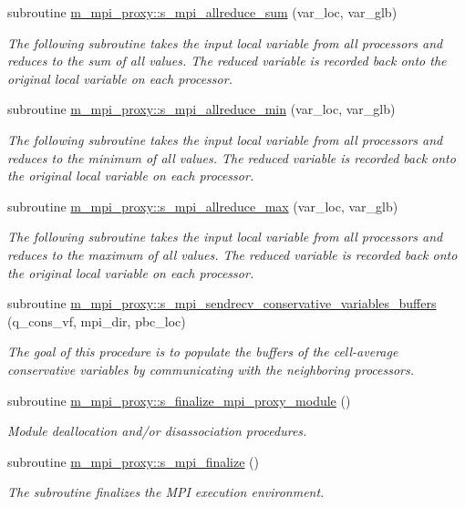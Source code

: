 \begin{DoxyCompactItemize}
subroutine \hyperlink{namespacem__mpi__proxy_a873520062481f3dabcfa77f9bd7728d3}{m\+\_\+mpi\+\_\+proxy\+::s\+\_\+mpi\+\_\+allreduce\+\_\+sum} (var\+\_\+loc, var\+\_\+glb)
\begin{DoxyCompactList}\small\item\em The following subroutine takes the input local variable from all processors and reduces to the sum of all values. The reduced variable is recorded back onto the original local variable on each processor. \end{DoxyCompactList}\item 
subroutine \hyperlink{namespacem__mpi__proxy_a398a372625502c0430a64e0bb23e2342}{m\+\_\+mpi\+\_\+proxy\+::s\+\_\+mpi\+\_\+allreduce\+\_\+min} (var\+\_\+loc, var\+\_\+glb)
\begin{DoxyCompactList}\small\item\em The following subroutine takes the input local variable from all processors and reduces to the minimum of all values. The reduced variable is recorded back onto the original local variable on each processor. \end{DoxyCompactList}\item 
subroutine \hyperlink{namespacem__mpi__proxy_aff7286de058c49b2a5d7a84be1983e8f}{m\+\_\+mpi\+\_\+proxy\+::s\+\_\+mpi\+\_\+allreduce\+\_\+max} (var\+\_\+loc, var\+\_\+glb)
\begin{DoxyCompactList}\small\item\em The following subroutine takes the input local variable from all processors and reduces to the maximum of all values. The reduced variable is recorded back onto the original local variable on each processor. \end{DoxyCompactList}\item 
subroutine \hyperlink{namespacem__mpi__proxy_a9015d32f3d27c21a75e8a916e5090b96}{m\+\_\+mpi\+\_\+proxy\+::s\+\_\+mpi\+\_\+sendrecv\+\_\+conservative\+\_\+variables\+\_\+buffers} (q\+\_\+cons\+\_\+vf, mpi\+\_\+dir, pbc\+\_\+loc)
\begin{DoxyCompactList}\small\item\em The goal of this procedure is to populate the buffers of the cell-\/average conservative variables by communicating with the neighboring processors. \end{DoxyCompactList}\item 
subroutine \hyperlink{namespacem__mpi__proxy_ac984c84fe4140876d6600250af9807da}{m\+\_\+mpi\+\_\+proxy\+::s\+\_\+finalize\+\_\+mpi\+\_\+proxy\+\_\+module} ()
\begin{DoxyCompactList}\small\item\em Module deallocation and/or disassociation procedures. \end{DoxyCompactList}\item 
subroutine \hyperlink{namespacem__mpi__proxy_a43fbda10c02ec8bc1fc572c83090f2e5}{m\+\_\+mpi\+\_\+proxy\+::s\+\_\+mpi\+\_\+finalize} ()
\begin{DoxyCompactList}\small\item\em The subroutine finalizes the M\+PI execution environment. \end{DoxyCompactList}\end{DoxyCompactItemize}

